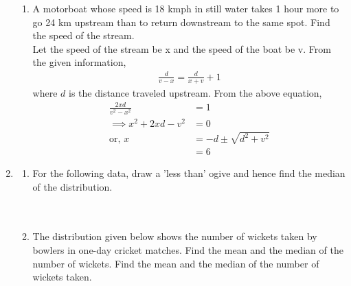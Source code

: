 \documentclass[journal,12pt,twocolumn]{IEEEtran}
\begin{document}
\begin{enumerate}[label=4.\arabic*]
\begin{enumerate}
		    
        \item A motorboat whose speed is 18 kmph in still water takes 1 hour more to go 24 km upstream than to return downstream to the same spot. Find the speed of the stream.\\
		\solution Let the speed of the stream be x and the speed of the boat be v.  From the given information, 
		    \begin{align}
			    \frac{d}{v-x} = \frac{d}{x+v} + 1
		    \end{align}
		    where $d$ is the distance traveled upstream.  From the above equation, 
		    \begin{align}
			    \frac{2xd}{v^2 - x^2} &= 1
			    \\
			    \implies 
			    x^2 +2xd -v^2 &=0
			    \\
			    \text{or, } x&= -d \pm \sqrt{d^2 + v^2}
			    \\
			    &= 6
		    \end{align}
    \end{enumerate}
    \item \begin{enumerate}
        \item For the following data, draw a 'less than' ogive and hence find the median of the distribution.\\
     \vspace{2mm}\\
    \vspace{2mm}\\
    \item The distribution given below shows the number of wickets taken by bowlers in one-day cricket matches. Find the mean and the median of the number of wickets. Find the mean and the median of the number of wickets taken.\\
     \vspace{2mm}\\
\end{enumerate}
\end{enumerate}
\end{document}
